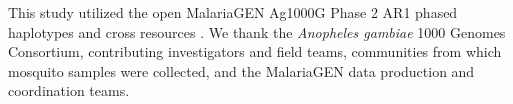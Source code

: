 This study utilized the open MalariaGEN Ag1000G Phase 2 AR1 phased haplotypes and cross resources \citep{malariagen_phase2_ar1_2017,ag1000g2020}. We thank the \textit{Anopheles gambiae} 1000 Genomes Consortium, contributing investigators and field teams, communities from which mosquito samples were collected, and the MalariaGEN data production and coordination teams.
